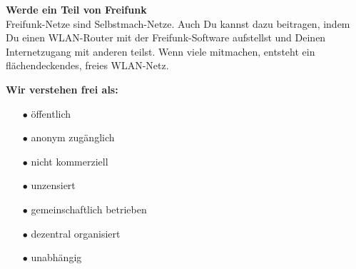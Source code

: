 \documentclass[a4paper]{article}
\begin{document}
\newpage
\thispagestyle{empty}

\begin{Row}
  \begin{Cell}{5}
    \textbf{Werde ein Teil von Freifunk} \\
Freifunk-Netze sind Selbstmach-Netze. Auch Du kannst dazu beitragen, indem Du einen WLAN-Router mit der Freifunk-Software aufstellst und Deinen Internetzugang mit anderen teilst. Wenn viele mitmachen, entsteht ein flächendeckendes, freies WLAN-Netz.
  \end{Cell}
  \begin{Cell}{4}
    \textbf{Wir verstehen frei als:} \vspace*{-0.35cm}

		\begin{itemize}
			\setlength{\itemindent}{0.5em}
		  \item[\textcolor{freifunkpink}{\Large$\bullet$}] öffentlich \vspace*{-0.3cm}
		  \item[\textcolor{freifunkpink}{\Large$\bullet$}] anonym zugänglich \vspace*{-0.3cm}
		  \item[\textcolor{freifunkpink}{\Large$\bullet$}] nicht kommerziell \vspace*{-0.3cm}
		  \item[\textcolor{freifunkpink}{\Large$\bullet$}] unzensiert \vspace*{-0.3cm}
		  \item[\textcolor{freifunkpink}{\Large$\bullet$}] gemeinschaftlich betrieben\vspace*{-0.3cm}
			\item[\textcolor{freifunkpink}{\Large$\bullet$}] dezentral organisiert\vspace*{-0.3cm}
		  \item[\textcolor{freifunkpink}{\Large$\bullet$}] unabhängig
		\end{itemize}
  \end{Cell}
\end{Row}

\vspace{1.5em}
\end{document}
